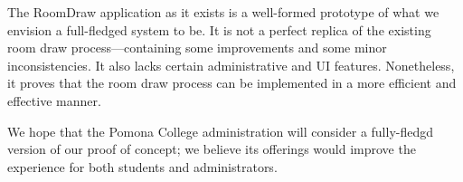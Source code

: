 The RoomDraw application as it exists is a well-formed prototype of what we
envision a full-fledged system to be.  It is not a perfect replica of the
existing room draw process---containing some improvements and some minor
inconsistencies. It also lacks certain administrative and UI features.
Nonetheless, it proves that the room draw process can be implemented in a more
efficient and effective manner.

We hope that the Pomona College administration will consider a fully-fledgd
version of our proof of concept; we believe its offerings would improve the
experience for both students and administrators.